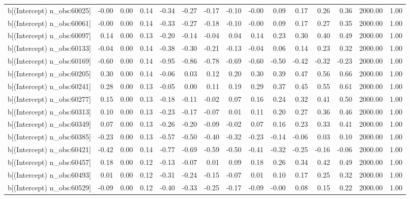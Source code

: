 \begin{table}[ht]
\begin{tabular}{rrrrrrrrrrrrrrr}
  b[(Intercept) n\_obs:60025] & -0.00 & 0.00 & 0.14 & -0.34 & -0.27 & -0.17 & -0.10 & -0.00 & 0.09 & 0.17 & 0.26 & 0.36 & 2000.00 & 1.00 \\ 
  b[(Intercept) n\_obs:60061] & -0.00 & 0.00 & 0.14 & -0.33 & -0.27 & -0.18 & -0.10 & -0.00 & 0.09 & 0.17 & 0.27 & 0.35 & 2000.00 & 1.00 \\ 
  b[(Intercept) n\_obs:60097] & 0.14 & 0.00 & 0.13 & -0.20 & -0.14 & -0.04 & 0.04 & 0.14 & 0.23 & 0.30 & 0.40 & 0.49 & 2000.00 & 1.00 \\ 
  b[(Intercept) n\_obs:60133] & -0.04 & 0.00 & 0.14 & -0.38 & -0.30 & -0.21 & -0.13 & -0.04 & 0.06 & 0.14 & 0.23 & 0.32 & 2000.00 & 1.00 \\ 
  b[(Intercept) n\_obs:60169] & -0.60 & 0.00 & 0.14 & -0.95 & -0.86 & -0.78 & -0.69 & -0.60 & -0.50 & -0.42 & -0.32 & -0.23 & 2000.00 & 1.00 \\ 
  b[(Intercept) n\_obs:60205] & 0.30 & 0.00 & 0.14 & -0.06 & 0.03 & 0.12 & 0.20 & 0.30 & 0.39 & 0.47 & 0.56 & 0.66 & 2000.00 & 1.00 \\ 
  b[(Intercept) n\_obs:60241] & 0.28 & 0.00 & 0.13 & -0.05 & 0.00 & 0.11 & 0.19 & 0.29 & 0.37 & 0.45 & 0.55 & 0.61 & 2000.00 & 1.00 \\ 
  b[(Intercept) n\_obs:60277] & 0.15 & 0.00 & 0.13 & -0.18 & -0.11 & -0.02 & 0.07 & 0.16 & 0.24 & 0.32 & 0.41 & 0.50 & 2000.00 & 1.00 \\ 
  b[(Intercept) n\_obs:60313] & 0.10 & 0.00 & 0.13 & -0.23 & -0.17 & -0.07 & 0.01 & 0.11 & 0.20 & 0.27 & 0.36 & 0.46 & 2000.00 & 1.00 \\ 
  b[(Intercept) n\_obs:60349] & 0.07 & 0.00 & 0.13 & -0.26 & -0.20 & -0.09 & -0.02 & 0.07 & 0.16 & 0.23 & 0.33 & 0.41 & 2000.00 & 1.00 \\ 
  b[(Intercept) n\_obs:60385] & -0.23 & 0.00 & 0.13 & -0.57 & -0.50 & -0.40 & -0.32 & -0.23 & -0.14 & -0.06 & 0.03 & 0.10 & 2000.00 & 1.00 \\ 
  b[(Intercept) n\_obs:60421] & -0.42 & 0.00 & 0.14 & -0.77 & -0.69 & -0.59 & -0.50 & -0.41 & -0.32 & -0.25 & -0.16 & -0.06 & 2000.00 & 1.00 \\ 
  b[(Intercept) n\_obs:60457] & 0.18 & 0.00 & 0.12 & -0.13 & -0.07 & 0.01 & 0.09 & 0.18 & 0.26 & 0.34 & 0.42 & 0.49 & 2000.00 & 1.00 \\ 
  b[(Intercept) n\_obs:60493] & 0.01 & 0.00 & 0.12 & -0.31 & -0.24 & -0.15 & -0.07 & 0.01 & 0.10 & 0.17 & 0.25 & 0.32 & 2000.00 & 1.00 \\ 
  b[(Intercept) n\_obs:60529] & -0.09 & 0.00 & 0.12 & -0.40 & -0.33 & -0.25 & -0.17 & -0.09 & -0.00 & 0.08 & 0.15 & 0.22 & 2000.00 & 1.00 \\ 

\end{tabular}
\end{table}
